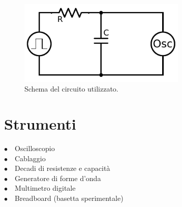 \begin{figure}
	\centering
    \includegraphics[width=80mm]{schema.pdf}
    \caption{Schema del circuito utilizzato.}
    \label{fig:circuito}
\end{figure}

\section{Strumenti}

$\bullet \quad$Oscilloscopio \\
$\bullet \quad$Cablaggio\\
$\bullet \quad$Decadi di resistenze e capacità\\
$\bullet \quad$Generatore di forme d'onda\\
$\bullet \quad$Multimetro digitale\\
$\bullet \quad$Breadboard (basetta sperimentale)\\

\hspace{2pt}\\